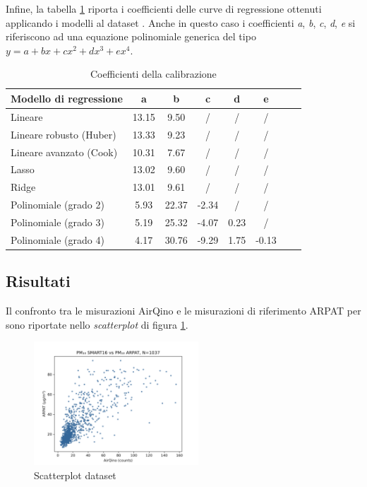 \clearpage
Infine, la tabella \ref{fig:risultati-pm2.5-coefficienti} riporta i coefficienti delle curve di regressione ottenuti applicando i modelli al dataset . Anche in questo caso i coefficienti \textit{a}, \textit{b}, \textit{c}, \textit{d}, \textit{e} si riferiscono ad una equazione polinomiale generica del tipo $y=a+bx+cx^2+dx^3+ex^4$.

\begin{table}[H]
    \footnotesize
    \centering
    \begin{tabular}{|l|c|c|c|c|c|c|c|}
    \hline
        \textbf{Modello di regressione} & \textbf{a} & \textbf{b} & \textbf{c} & \textbf{d} & \textbf{e} \\ \hline
        Lineare & 13.15 & 9.50 & / & / & / \\ \hline
        Lineare robusto (Huber) & 13.33 & 9.23 & / & / & / \\ \hline
        Lineare avanzato (Cook) & 10.31 & 7.67 & / & / & / \\ \hline
        Lasso & 13.02 & 9.60 & / & / & / \\ \hline
        Ridge & 13.01 & 9.61 & / & / & / \\ \hline
        Polinomiale (grado 2) & 5.93 & 22.37 & -2.34 & / & / \\ \hline
        Polinomiale (grado 3) & 5.19 & 25.32 & -4.07 & 0.23 & / \\ \hline
        Polinomiale (grado 4) & 4.17 & 30.76 & -9.29 & 1.75 & -0.13 \\ \hline
    \end{tabular}
    \captionsetup{justification=centering}
    \caption{Coefficienti della calibrazione }
    \label{fig:risultati-pm2.5-coefficienti}
\end{table}


\subsection{Risultati }\label{ssec:risultati-pm10}

Il confronto tra le misurazioni AirQino e le misurazioni di riferimento ARPAT per  sono riportate nello \textit{scatterplot} di figura \ref{fig:scatterplot_pm10}.

\clearpage

\begin{figure}[H]
\centering
\includegraphics[width=0.55\textwidth,height=\textheight,keepaspectratio]{img/sc_pm10.png}
\caption{Scatterplot dataset }
\label{fig:scatterplot_pm10}
\end{figure}

